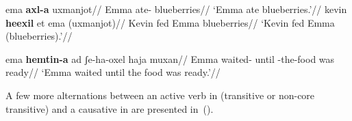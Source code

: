\pex
	\a \begingl
		\gla ema \textbf{axl-a} uxmanjot//
		\glb Emma ate- blueberries//
		\glft `Emma ate blueberries.'//
	\endgl
	\a \begingl
		\gla kevin \textbf{heexil} et ema (uxmanjot)//
		\glb Kevin fed  Emma blueberries//
		\glft `Kevin fed Emma (blueberries).'//
	\endgl %
\xe

\ex \label{ex:vd:unerg} \begingl
	\gla ema \textbf{hemtin-a} ad ʃe-ha-oxel haja muxan//
	\glb Emma waited- until -the-food was ready//
	\glft `Emma waited until the food was ready.'//
	\endgl
\xe
	
A few more alternations between an active verb in {\tkal} (transitive or non-core transitive) and a causative in {\thif} are presented in~(\nextx).
\ex\label{ex:vd:kal-thif}
\xe

